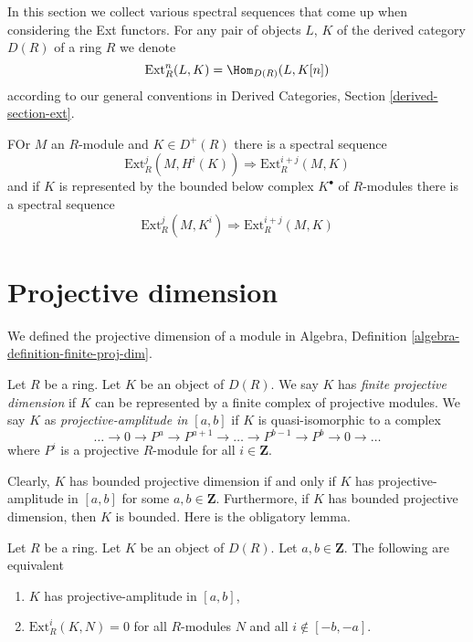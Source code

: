 \noindent
In this section we collect various spectral sequences that come up
when considering the Ext functors. For any pair of objects
$L$, $K$ of the derived category $D(R)$ of a ring $R$
we denote
$$
\text{Ext}^n_R(L, K) = \Hom_{D(R)}(L, K[n])
$$
according to our general conventions in
Derived Categories, Section \ref{derived-section-ext}.

\medskip\noindent
FOr $M$ an $R$-module and $K \in D^+(R)$ there is a spectral sequence
\begin{equation}
\label{equation-first-ss-ext}
\text{Ext}_R^j(M, H^i(K)) \Rightarrow \text{Ext}_R^{i + j}(M, K)
\end{equation}
and if $K$ is represented by the bounded below complex $K^\bullet$
of $R$-modules there is a spectral sequence
\begin{equation}
\label{equation-second-ss-ext}
\text{Ext}_R^j(M, K^i) \Rightarrow \text{Ext}_R^{i + j}(M, K)
\end{equation}




\section{Projective dimension}
\label{section-projective-dimension}

\noindent
We defined the projective dimension of a module in
Algebra, Definition \ref{algebra-definition-finite-proj-dim}.

\begin{definition}
\label{definition-projective-dimension}
Let $R$ be a ring. Let $K$ be an object of $D(R)$. We say $K$ has
{\it finite projective dimension} if $K$ can be represented by a
finite complex of projective modules. We say $K$ as
{\it projective-amplitude in $[a, b]$} if  $K$ is quasi-isomorphic
to a complex
$$
\ldots \to 0 \to P^a \to P^{a + 1} \to \ldots \to
P^{b - 1} \to P^b \to 0 \to \ldots
$$
where $P^i$ is a projective $R$-module for all $i \in \mathbf{Z}$.
\end{definition}

\noindent
Clearly, $K$ has bounded projective dimension if and only if $K$
has projective-amplitude in $[a, b]$ for some $a, b \in \mathbf{Z}$.
Furthermore, if $K$ has bounded projective dimension, then $K$
is bounded. Here is the obligatory lemma.

\begin{lemma}
\label{lemma-projective-amplitude}
Let $R$ be a ring. Let $K$ be an object of $D(R)$. Let $a, b \in \mathbf{Z}$.
The following are equivalent
\begin{enumerate}
\item $K$ has projective-amplitude in $[a, b]$,
\item $\text{Ext}^i_R(K, N) = 0$ for all $R$-modules $N$ and all
$i \not \in [-b, -a]$.
\end{enumerate}
\end{lemma}

